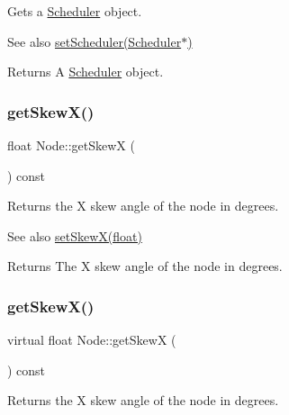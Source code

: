 Gets a \hyperlink{classScheduler}{Scheduler} object.

\begin{DoxySeeAlso}{See also}
\hyperlink{classNode_a9f0c84dfabdce76b5251725944ae7706}{set\+Scheduler(\+Scheduler$\ast$)} 
\end{DoxySeeAlso}
\begin{DoxyReturn}{Returns}
A \hyperlink{classScheduler}{Scheduler} object. 
\end{DoxyReturn}
\mbox{\label{classNode_adb23628a9cef9c16cfcfd955a51ac8bd}} 
\subsubsection{\texorpdfstring{get\+Skew\+X()}{getSkewX()}\hspace{0.1cm}{\footnotesize\ttfamily [1/2]}}
{\footnotesize\ttfamily float Node\+::get\+SkewX (\begin{DoxyParamCaption}{ }\end{DoxyParamCaption}) const\hspace{0.3cm}{\ttfamily [virtual]}}

Returns the X skew angle of the node in degrees.

\begin{DoxySeeAlso}{See also}
{\ttfamily \hyperlink{classNode_a48cf4d7b304b57a3f593d9eecde3ac7f}{set\+Skew\+X(float)}}
\end{DoxySeeAlso}
\begin{DoxyReturn}{Returns}
The X skew angle of the node in degrees. 
\end{DoxyReturn}
\mbox{\label{classNode_adb7b2e936143dfd1622c568b2d56792b}} 
\subsubsection{\texorpdfstring{get\+Skew\+X()}{getSkewX()}\hspace{0.1cm}{\footnotesize\ttfamily [2/2]}}
{\footnotesize\ttfamily virtual float Node\+::get\+SkewX (\begin{DoxyParamCaption}{ }\end{DoxyParamCaption}) const\hspace{0.3cm}{\ttfamily [virtual]}}

Returns the X skew angle of the node in degrees.

